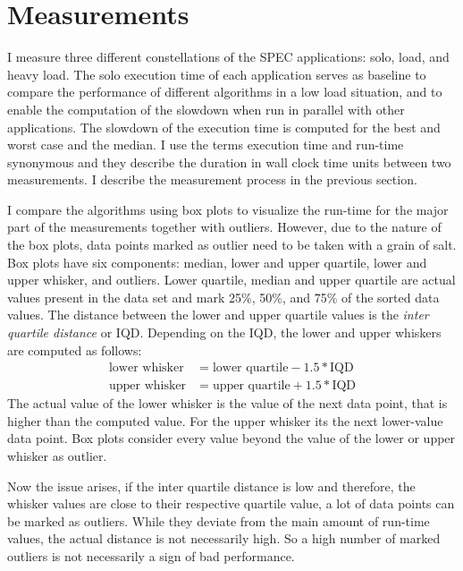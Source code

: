 \section{Measurements}
\label{eval:measurements}

I measure three different constellations of the SPEC applications: solo, load,
and heavy load.
The solo execution time of each application serves as baseline to compare the
performance of different algorithms in a low load situation, and to enable the
computation of the slowdown when run in parallel with other applications.
The slowdown of the execution time is computed for the best and worst
case and the median.
I use the terms execution time and run-time synonymous and they describe the
duration in wall clock time units between two measurements.
I describe the measurement process in the previous section.

I compare the algorithms using box plots to visualize
the run-time for the major part of the measurements together with outliers.
However, due to the nature of the box plots, data points marked as outlier need
to be taken with a grain of salt.
Box plots have six components: median, lower and upper quartile, lower and
upper whisker, and outliers.
Lower quartile, median and upper quartile are actual values present in the data
set and mark 25\%, 50\%, and 75\% of the sorted data values.
The distance between the lower and upper quartile values is the \emph{inter
quartile distance} or IQD.
Depending on the IQD, the lower and upper whiskers are computed as follows:
%
\begin{align*}
  \text{lower whisker} &= \text{lower quartile} - 1.5 * \text{IQD}\\
  \text{upper whisker} &= \text{upper quartile} + 1.5 * \text{IQD}
\end{align*}
%
The actual value of the lower whisker is the value of the next data point,
that is higher than the computed value.
For the upper whisker its the next lower-value data point.
Box plots consider every value beyond the value of the lower or upper whisker
as outlier.

Now the issue arises, if the inter quartile distance is low and therefore,
the whisker values are close to their respective quartile value, a lot of
data points can be marked as outliers.
While they deviate from the main amount of run-time values, the actual distance
is not necessarily high.
So a high number of marked outliers is not necessarily a sign of bad performance.

